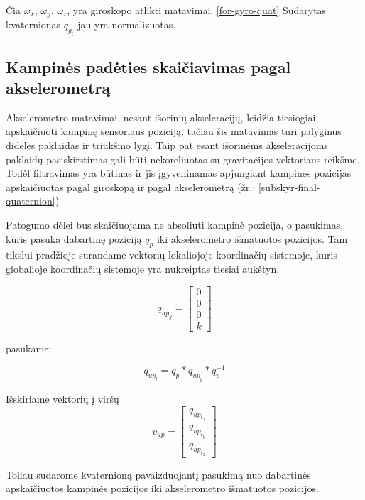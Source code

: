 \documentclass[12pt, a4paper, lithuanian, final]{article}
\begin{document}
Čia $\omega_x$, $\omega_y$, $\omega_z$, yra giroskopo atlikti matavimai.
\ref{for-gyro-quat} Sudarytas kvaternionas $q_{g_t}$ jau yra normalizuotas.


\subsection{Kampinės padėties skaičiavimas pagal akselerometrą}

Akselerometro matavimai, nesant išorinių akseleracijų, leidžia tiesiogiai apskaičiuoti kampinę sensoriaus poziciją, tačiau šis matavimas turi palyginus dideles paklaidas ir triukšmo lygį.
Taip pat esant išorinėms akseleracijoms paklaidų pasiskirstimas gali būti nekoreliuotas su gravitacijos vektoriaus reikšme.
Todėl filtravimas yra būtinas ir jis įgyveninamas apjungiant kampines pozicijas apskaičiuotas pagal giroskopą ir pagal akselerometrą (žr.: \ref{subskyr-final-quaternion})

Patogumo dėlei bus skaičiuojama ne absoliuti kampinė pozicija, o pasukimas, kuris pasuka dabartinę poziciją $q_p$ iki akselerometro išmatuotos pozicijos.
Tam tikslui pradžioje surandame vektorių lokaliojoje koordinačių sistemoje, kuris globalioje koordinačių sistemoje yra nukreiptas tiesiai aukštyn.

\begin{equation}
	q_{up_g} = \left[
		\begin{array}{c}
			0 \\
			0 \\
			0 \\
			k
		\end{array}
	\right]
\end{equation}

pasukame:

\begin{equation}
	q_{up_l} = q_{p} * q_{up_g} * q_{p}^{-1}
\end{equation}

Išskiriame vektorių į viršų
\begin{equation}
	v_{up} = \left[
		\begin{array}{c}
			q_{{up_l}_x} \\
			q_{{up_l}_y} \\
			q_{{up_l}_z}
		\end{array}
	\right]
\end{equation}

Toliau sudarome kvaternioną pavaizduojantį pasukimą nuo dabartinės apskaičiuotos kampinės pozicijos iki akselerometro išmatuotos pozicijos.
\end{document}
